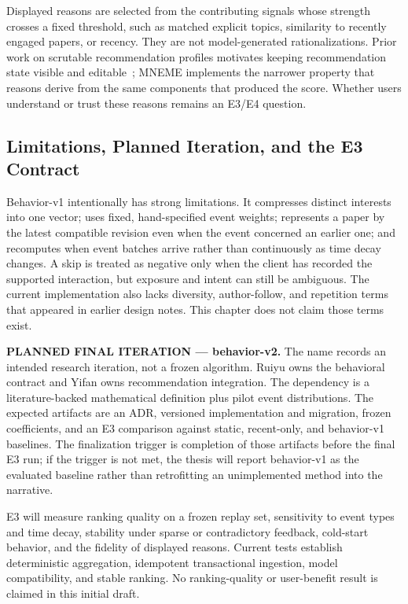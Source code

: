 Displayed reasons are selected from the contributing signals whose strength crosses a fixed threshold, such as matched explicit topics, similarity to recently engaged papers, or recency. They are not model-generated rationalizations. Prior work on scrutable recommendation profiles motivates keeping recommendation state visible and editable~\cite{ramos2024scrutable}; MNEME implements the narrower property that reasons derive from the same components that produced the score. Whether users understand or trust these reasons remains an E3/E4 question.

\subsection{Limitations, Planned Iteration, and the E3 Contract}

Behavior-v1 intentionally has strong limitations. It compresses distinct interests into one vector; uses fixed, hand-specified event weights; represents a paper by the latest compatible revision even when the event concerned an earlier one; and recomputes when event batches arrive rather than continuously as time decay changes. A skip is treated as negative only when the client has recorded the supported interaction, but exposure and intent can still be ambiguous. The current implementation also lacks diversity, author-follow, and repetition terms that appeared in earlier design notes. This chapter does not claim those terms exist.

\textbf{PLANNED FINAL ITERATION --- behavior-v2.} The name records an intended research iteration, not a frozen algorithm. Ruiyu owns the behavioral contract and Yifan owns recommendation integration. The dependency is a literature-backed mathematical definition plus pilot event distributions. The expected artifacts are an ADR, versioned implementation and migration, frozen coefficients, and an E3 comparison against static, recent-only, and behavior-v1 baselines. The finalization trigger is completion of those artifacts before the final E3 run; if the trigger is not met, the thesis will report behavior-v1 as the evaluated baseline rather than retrofitting an unimplemented method into the narrative.

E3 will measure ranking quality on a frozen replay set, sensitivity to event types and time decay, stability under sparse or contradictory feedback, cold-start behavior, and the fidelity of displayed reasons. Current tests establish deterministic aggregation, idempotent transactional ingestion, model compatibility, and stable ranking. No ranking-quality or user-benefit result is claimed in this initial draft.

